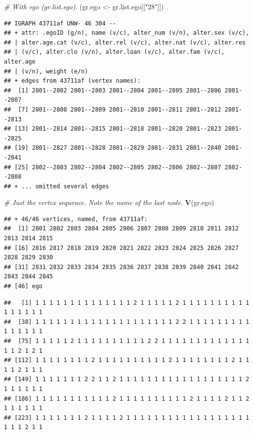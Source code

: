 \documentclass[
]{book}
\newenvironment{Shaded}{\begin{snugshade}}{\end{snugshade}}
\newcommand{\CommentTok}[1]{\textcolor[rgb]{0.56,0.35,0.01}{\textit{#1}}}
\newcommand{\FunctionTok}[1]{\textcolor[rgb]{0.13,0.29,0.53}{\textbf{#1}}}
\newcommand{\NormalTok}[1]{#1}
\newcommand{\OtherTok}[1]{\textcolor[rgb]{0.56,0.35,0.01}{#1}}
\newcommand{\SpecialCharTok}[1]{\textcolor[rgb]{0.81,0.36,0.00}{\textbf{#1}}}
\newcommand{\StringTok}[1]{\textcolor[rgb]{0.31,0.60,0.02}{#1}}
\begin{document}
\begin{Shaded}
\begin{Highlighting}[]
\CommentTok{\# With ego (gr.list.ego). }
\NormalTok{(gr.ego }\OtherTok{\textless{}{-}}\NormalTok{ gr.list.ego[[}\StringTok{"28"}\NormalTok{]])}
\end{Highlighting}
\end{Shaded}

\begin{verbatim}
## IGRAPH 43711af UNW- 46 304 -- 
## + attr: .egoID (g/n), name (v/c), alter_num (v/n), alter.sex (v/c),
## | alter.age.cat (v/c), alter.rel (v/c), alter.nat (v/c), alter.res
## | (v/c), alter.clo (v/n), alter.loan (v/c), alter.fam (v/c), alter.age
## | (v/n), weight (e/n)
## + edges from 43711af (vertex names):
##  [1] 2801--2802 2801--2803 2801--2804 2801--2805 2801--2806 2801--2807
##  [7] 2801--2808 2801--2809 2801--2810 2801--2811 2801--2812 2801--2813
## [13] 2801--2814 2801--2815 2801--2818 2801--2820 2801--2823 2801--2825
## [19] 2801--2827 2801--2828 2801--2829 2801--2831 2801--2840 2801--2841
## [25] 2802--2803 2802--2804 2802--2805 2802--2806 2802--2807 2802--2808
## + ... omitted several edges
\end{verbatim}

\begin{Shaded}
\begin{Highlighting}[]
\CommentTok{\# Just the vertex sequence. Note the name of the last node.}
\FunctionTok{V}\NormalTok{(gr.ego)}
\end{Highlighting}
\end{Shaded}

\begin{verbatim}
## + 46/46 vertices, named, from 43711af:
##  [1] 2801 2802 2803 2804 2805 2806 2807 2808 2809 2810 2811 2812 2813 2814 2815
## [16] 2816 2817 2818 2819 2820 2821 2822 2823 2824 2825 2826 2827 2828 2829 2830
## [31] 2831 2832 2833 2834 2835 2836 2837 2838 2839 2840 2841 2842 2843 2844 2845
## [46] ego
\end{verbatim}

\begin{Shaded}
\end{Shaded}

\begin{verbatim}
##   [1] 1 1 1 1 1 1 1 1 1 1 1 1 1 1 2 1 1 1 1 1 2 1 1 1 1 1 1 1 1 1 1 1 1 1 1 1 1
##  [38] 1 1 1 1 1 1 1 1 1 1 1 1 1 1 1 1 1 1 1 1 2 2 1 1 1 1 1 1 1 1 1 1 1 1 1 1 1
##  [75] 1 1 1 1 1 2 1 1 1 1 1 1 1 1 1 1 2 2 1 1 1 1 1 1 1 1 1 1 1 1 1 1 1 2 1 2 1
## [112] 1 1 1 1 1 1 1 1 2 1 1 1 1 1 1 1 1 1 1 2 1 1 1 1 1 1 1 1 2 1 1 1 1 2 1 1 1
## [149] 1 1 1 1 1 1 1 2 2 1 1 2 1 1 1 1 1 1 1 1 1 1 1 1 1 1 1 1 1 1 2 1 1 1 1 1 1
## [186] 1 1 1 1 1 1 1 1 1 1 1 2 1 1 1 1 1 1 1 1 1 1 2 1 1 1 1 2 1 1 2 1 1 1 1 1 1
## [223] 1 1 1 1 1 1 1 2 1 1 1 1 2 1 1 1 1 1 1 1 1 1 1 1 1 1 1 1 1 1 1 1 1 1 2 1 1
\end{verbatim}
\end{document}
